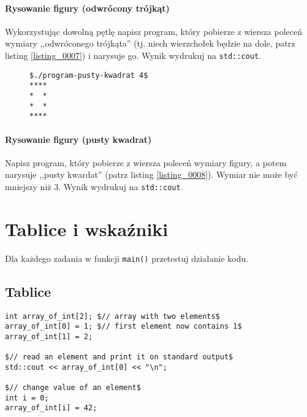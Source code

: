 \documentclass[11pt,a4paper,titlepage,onecolumn]{article}
\begin{document}
\paragraph{Rysowanie figury (odwrócony trójkąt)} Wykorzystując dowolną pętlę
napisz program, który pobierze z wiersza poleceń wymiary ,,odwróconego
trójkąta'' (tj.  niech wierzchołek będzie na dole, patrz listing
\ref{listing_0007}) i narysuje go. Wynik wydrukuj na \texttt{std::cout}.

\begin{figure}[!htp]
\begin{lstlisting}[caption={pusty kwardat},
    captionpos=b,
    label=listing_0008]
$./program-pusty-kwadrat 4$
****
*  *
*  *
****
\end{lstlisting}
\end{figure}

\paragraph{Rysowanie figury (pusty kwadrat)} Napisz program, który pobierze z
wiersza poleceń wymiary figury, a potem narysuje ,,pusty kwardat'' (patrz
listing \ref{listing_0008}). Wymiar nie może być mniejszy niż 3.
Wynik wydrukuj na \texttt{std::cout}.

\newpage
\section{Tablice i wskaźniki}

Dla każdego zadania w funkcji \texttt{main()} przetestuj działanie kodu.

\subsection{Tablice}

\begin{lstlisting}[caption={tworzenie i użycie tablicy},
    captionpos=b,
    label=listing_howto_array]
int array_of_int[2]; $// array with two elements$
array_of_int[0] = 1; $// first element now contains 1$
array_of_int[1] = 2;

$// read an element and print it on standard output$
std::cout << array_of_int[0] << "\n";

$// change value of an element$
int i = 0;
array_of_int[i] = 42;
\end{lstlisting}
\end{document}
